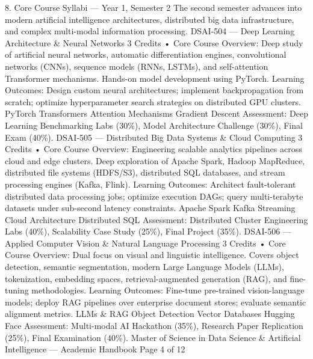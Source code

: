 \documentclass[12pt]{article}
\begin{document}
8. Core Course Syllabi — Year 1, Semester 2
The second semester advances into modern artificial intelligence architectures, distributed big data infrastructure,
and complex multi-modal information processing.
DSAI-504 — Deep Learning Architecture \& Neural Networks
3 Credits • Core
Course Overview: Deep study of artificial neural networks, automatic differentiation engines, convolutional
networks (CNNs), sequence models (RNNs, LSTMs), and self-attention Transformer mechanisms. Hands-on
model development using PyTorch.
Learning Outcomes: Design custom neural architectures; implement backpropagation from scratch; optimize
hyperparameter search strategies on distributed GPU clusters.
PyTorch Transformers Attention Mechanisms Gradient Descent
Assessment: Deep Learning Benchmarking Labs (30\%), Model Architecture Challenge (30\%), Final Exam (40\%).
DSAI-505 — Distributed Big Data Systems \& Cloud Computing
3 Credits • Core
Course Overview: Engineering scalable analytics pipelines across cloud and edge clusters. Deep exploration of
Apache Spark, Hadoop MapReduce, distributed file systems (HDFS/S3), distributed SQL databases, and stream
processing engines (Kafka, Flink).
Learning Outcomes: Architect fault-tolerant distributed data processing jobs; optimize execution DAGs; query
multi-terabyte datasets under sub-second latency constraints.
Apache Spark Kafka Streaming Cloud Architecture Distributed SQL
Assessment: Distributed Cluster Engineering Labs (40\%), Scalability Case Study (25\%), Final Project (35\%).
DSAI-506 — Applied Computer Vision \& Natural Language Processing
3 Credits • Core
Course Overview: Dual focus on visual and linguistic intelligence. Covers object detection, semantic
segmentation, modern Large Language Models (LLMs), tokenization, embedding spaces, retrieval-augmented
generation (RAG), and fine-tuning methodologies.
Learning Outcomes: Fine-tune pre-trained vision-language models; deploy RAG pipelines over enterprise
document stores; evaluate semantic alignment metrics.
LLMs \& RAG Object Detection Vector Databases Hugging Face
Assessment: Multi-modal AI Hackathon (35\%), Research Paper Replication (25\%), Final Examination (40\%).
Master of Science in Data Science \& Artificial Intelligence — Academic Handbook
Page 4 of 12
\end{document}
